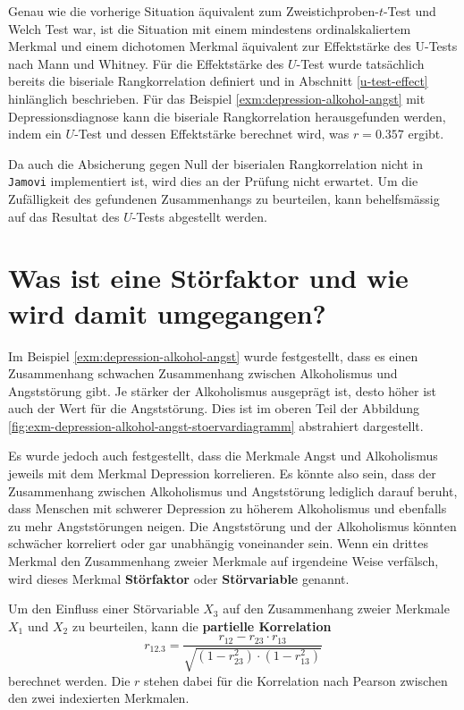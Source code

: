 \documentclass[
]{book}
\theoremstyle{definition}
\theoremstyle{definition}
\theoremstyle{definition}
\theoremstyle{definition}
\theoremstyle{remark}
\begin{document}
Genau wie die vorherige Situation äquivalent zum Zweistichproben-\(t\)-Test und Welch Test war, ist die Situation mit einem mindestens ordinalskaliertem Merkmal und einem dichotomen Merkmal äquivalent zur Effektstärke des U-Tests nach Mann und Whitney. Für die Effektstärke des \(U\)-Test wurde tatsächlich bereits die biseriale Rangkorrelation definiert und in Abschnitt \ref{u-test-effect} hinlänglich beschrieben. Für das Beispiel \ref{exm:depression-alkohol-angst} mit Depressionsdiagnose kann die biseriale Rangkorrelation herausgefunden werden, indem ein \(U\)-Test und dessen Effektstärke berechnet wird, was \(r = 0.357\) ergibt.

Da auch die Absicherung gegen Null der biserialen Rangkorrelation nicht in \texttt{Jamovi} implementiert ist, wird dies an der Prüfung nicht erwartet. Um die Zufälligkeit des gefundenen Zusammenhangs zu beurteilen, kann behelfsmässig auf das Resultat des \(U\)-Tests abgestellt werden.

\section{Was ist eine Störfaktor und wie wird damit umgegangen?}\label{stoerfaktor}

Im Beispiel \ref{exm:depression-alkohol-angst} wurde festgestellt, dass es einen Zusammenhang schwachen Zusammenhang zwischen Alkoholismus und Angststörung gibt. Je stärker der Alkoholismus ausgeprägt ist, desto höher ist auch der Wert für die Angststörung. Dies ist im oberen Teil der Abbildung \ref{fig:exm-depression-alkohol-angst-stoervardiagramm} abstrahiert dargestellt.

Es wurde jedoch auch festgestellt, dass die Merkmale Angst und Alkoholismus jeweils mit dem Merkmal Depression korrelieren. Es könnte also sein, dass der Zusammenhang zwischen Alkoholismus und Angststörung lediglich darauf beruht, dass Menschen mit schwerer Depression zu höherem Alkoholismus und ebenfalls zu mehr Angststörungen neigen. Die Angststörung und der Alkoholismus könnten schwächer korreliert oder gar unabhängig voneinander sein. Wenn ein drittes Merkmal den Zusammenhang zweier Merkmale auf irgendeine Weise verfälsch, wird dieses Merkmal \label{customdef-stoerfaktor}{\textbf{Störfaktor}} oder \textbf{Störvariable} genannt.

Um den Einfluss einer Störvariable \(X_3\) auf den Zusammenhang zweier Merkmale \(X_1\) und \(X_2\) zu beurteilen, kann die \label{customdef-partielle-korrelation}{\textbf{partielle Korrelation}}
\[r_{12.3} = \frac{r_{12}- r_{23}\cdot r_{13}}{\sqrt{(1-r_{23}^2)\cdot(1-r_{13}^2)}}\]
berechnet werden. Die \(r\) stehen dabei für die Korrelation nach Pearson zwischen den zwei indexierten Merkmalen.
\end{document}
